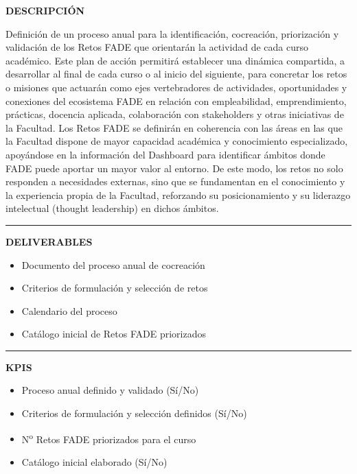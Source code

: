 \documentclass[11pt,a4paper]{scrreprt}
\newcommand{\fieldlabel}[1]{%
  {\footnotesize\sffamily\bfseries\color{mutedcolor}\MakeUppercase{#1}}\par\nopagebreak[4]
}
\newcommand{\fieldsep}{\vspace{3pt}\noindent\textcolor{bordercolor}{\rule{\linewidth}{0.4pt}}\vspace{3pt}\par}
\begin{document}
\vspace{8pt}

\begin{tcolorbox}[pabox={filcolor}{PA1.2 \enspace\textbullet\enspace Definición del proceso anual de cocreación y priorización de Retos FADE}]

\fieldlabel{Descripci\'on}
{\small Definición de un proceso anual para la identificación, cocreación, priorización y validación de los Retos FADE que orientarán la actividad de cada curso académico. Este plan de acción permitirá establecer una dinámica compartida, a desarrollar al final de cada curso o al inicio del siguiente, para concretar los retos o misiones que actuarán como ejes vertebradores de actividades, oportunidades y conexiones del ecosistema FADE en relación con empleabilidad, emprendimiento, prácticas, docencia aplicada, colaboración con stakeholders y otras iniciativas de la Facultad. Los Retos FADE se definirán en coherencia con las áreas en las que la Facultad dispone de mayor capacidad académica y conocimiento especializado, apoyándose en la información del Dashboard para identificar ámbitos donde FADE puede aportar un mayor valor al entorno. De este modo, los retos no solo responden a necesidades externas, sino que se fundamentan en el conocimiento y la experiencia propia de la Facultad, reforzando su posicionamiento y su liderazgo intelectual (thought leadership) en dichos ámbitos. }\par
\fieldsep
\fieldlabel{Deliverables}
{\small \begin{itemize}[noitemsep,topsep=2pt]
\item Documento del proceso anual de cocreación
\item Criterios de formulación y selección de retos
\item Calendario del proceso
\item Catálogo inicial de Retos FADE priorizados
\end{itemize}}\par
\fieldsep
\fieldlabel{KPIs}
{\small \begin{itemize}[noitemsep,topsep=2pt]
\item Proceso anual definido y validado (Sí/No)
\item Criterios de formulación y selección definidos (Sí/No)
\item N\textsuperscript{o} Retos FADE priorizados para el curso
\item Catálogo inicial elaborado (Sí/No)
\end{itemize}}\par
\end{tcolorbox}
\end{document}

